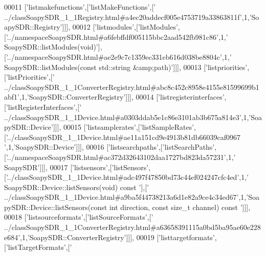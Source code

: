 \begin{DoxyCode}
00011   [\textcolor{stringliteral}{'listmakefunctions'},[\textcolor{stringliteral}{'listMakeFunctions'},[\textcolor{stringliteral}{'
      ../classSoapySDR\_1\_1Registry.html#a4ec20addecf005e4753719a33863811f'},1,\textcolor{stringliteral}{'SoapySDR::Registry'}]]],
00012   [\textcolor{stringliteral}{'listmodules'},[\textcolor{stringliteral}{'listModules'},[\textcolor{stringliteral}{'../namespaceSoapySDR.html#a6febffdf005115bbc2aad542fb981c86'},1,\textcolor{stringliteral}{'
      SoapySDR::listModules(void)'}],[\textcolor{stringliteral}{'../namespaceSoapySDR.html#ae2e9c7c1359ec331eb616d038be8804c'},1,\textcolor{stringliteral}{'
      SoapySDR::listModules(const std::string &amp;path)'}]]],
00013   [\textcolor{stringliteral}{'listpriorities'},[\textcolor{stringliteral}{'listPriorities'},[\textcolor{stringliteral}{'
      ../classSoapySDR\_1\_1ConverterRegistry.html#abc8c452c8958e4155e81599699b1abf1'},1,\textcolor{stringliteral}{'SoapySDR::ConverterRegistry'}]]],
00014   [\textcolor{stringliteral}{'listregisterinterfaces'},[\textcolor{stringliteral}{'listRegisterInterfaces'},[\textcolor{stringliteral}{'
      ../classSoapySDR\_1\_1Device.html#a0303ddab5e1c86e3101ab3b675a814e3'},1,\textcolor{stringliteral}{'SoapySDR::Device'}]]],
00015   [\textcolor{stringliteral}{'listsamplerates'},[\textcolor{stringliteral}{'listSampleRates'},[\textcolor{stringliteral}{'../classSoapySDR\_1\_1Device.html#ae11a151cd9e4913b81db66039caf0967
      '},1,\textcolor{stringliteral}{'SoapySDR::Device'}]]],
00016   [\textcolor{stringliteral}{'listsearchpaths'},[\textcolor{stringliteral}{'listSearchPaths'},[\textcolor{stringliteral}{'../namespaceSoapySDR.html#ac372d32643102daa1727bd823da57231'},1,\textcolor{stringliteral}{'
      SoapySDR'}]]],
00017   [\textcolor{stringliteral}{'listsensors'},[\textcolor{stringliteral}{'listSensors'},[\textcolor{stringliteral}{'../classSoapySDR\_1\_1Device.html#adc497f47850bd73c44ef024247cfc4ed'},1,\textcolor{stringliteral}{'
      SoapySDR::Device::listSensors(void) const '}],[\textcolor{stringliteral}{'
      ../classSoapySDR\_1\_1Device.html#a9ba5f44738213a6d1e82a9ce4c34ed67'},1,\textcolor{stringliteral}{'SoapySDR::Device::listSensors(const int direction, const size\_t channel) const '}]]],
00018   [\textcolor{stringliteral}{'listsourceformats'},[\textcolor{stringliteral}{'listSourceFormats'},[\textcolor{stringliteral}{'
      ../classSoapySDR\_1\_1ConverterRegistry.html#a63658391115a0bd5ba95ae60e228e684'},1,\textcolor{stringliteral}{'SoapySDR::ConverterRegistry'}]]],
00019   [\textcolor{stringliteral}{'listtargetformats'},[\textcolor{stringliteral}{'listTargetFormats'},[\textcolor{stringliteral}{'
}
\end{DoxyCode}
